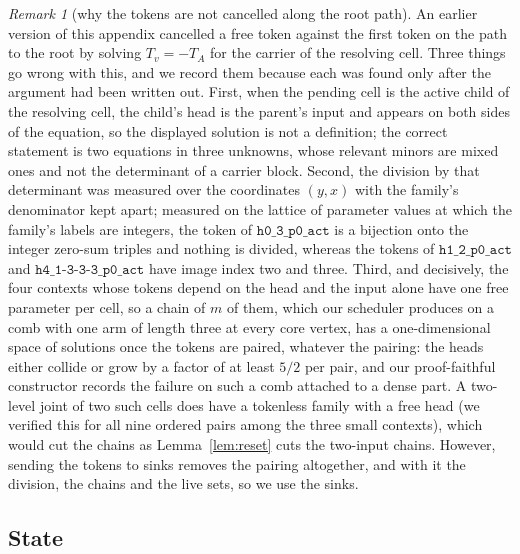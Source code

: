 \documentclass[11pt,a4paper]{article}
\theoremstyle{plain}
\theoremstyle{definition}
\theoremstyle{remark}
\newtheorem{remark}[theorem]{Remark}
\begin{document}
\begin{remark}[why the tokens are not cancelled along the root path]\label{rem:whysinks}
An earlier version of this appendix cancelled a free token against the first
token on the path to the root by solving $T_v=-T_A$ for the carrier of the
resolving cell.  Three things go wrong with this, and we record them because
each was found only after the argument had been written out.  First, when
the pending cell is the active child of the resolving cell, the child's head
is the parent's input and appears on both sides of the equation, so the
displayed solution is not a definition; the correct statement is two
equations in three unknowns, whose relevant minors are mixed ones and not the
determinant of a carrier block.  Second, the division by that determinant was
measured over the coordinates $(y,x)$ with the family's denominator kept
apart; measured on the lattice of parameter values at which the family's
labels are integers, the token of $\mathtt{h0\_3\_p0\_act}$ is a bijection
onto the integer zero-sum triples and nothing is divided, whereas the tokens
of $\mathtt{h1\_2\_p0\_act}$ and $\mathtt{h4\_1\text{-}3\text{-}3\text{-}3\_p0\_act}$
have image index two and three.  Third, and decisively, the four contexts
whose tokens depend on the head and the input alone have one free parameter
per cell, so a chain of $m$ of them, which our scheduler produces on a comb
with one arm of length three at every core vertex, has a one-dimensional space
of solutions once the tokens are paired, whatever the pairing: the heads
either collide or grow by a factor of at least $5/2$ per pair, and our
proof-faithful constructor records the failure on such a comb attached to a
dense part.  A two-level joint of two such cells does have a tokenless family
with a free head (we verified this for all nine ordered pairs among the three
small contexts), which would cut the chains as Lemma~\ref{lem:reset} cuts the
two-input chains.  However, sending the tokens to sinks removes the pairing
altogether, and with it the division, the chains and the live sets, so we use
the sinks.
\end{remark}

\subsection*{State}
\end{document}
